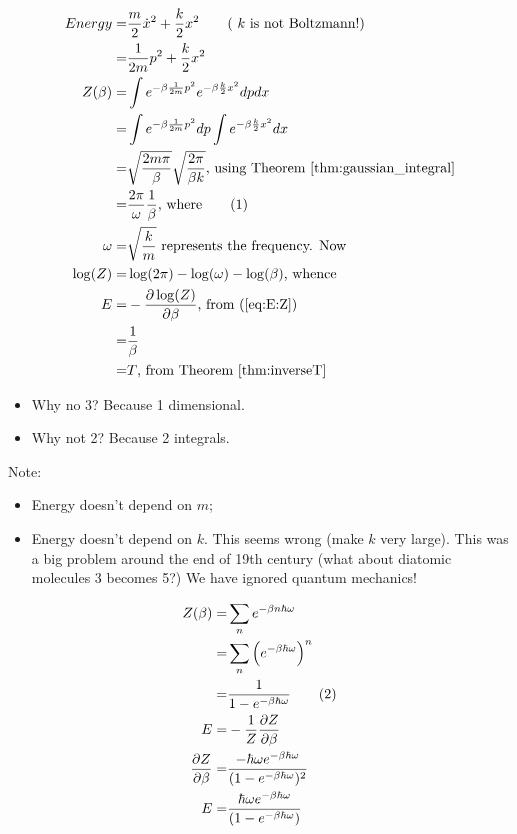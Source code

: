 \documentclass[]{article}
\newcommand\numberthis{\addtocounter{equation}{1}\tag{\theequation}}
\begin{document}
\begin{align*}
Energy =& \frac{m}{2} \dot{x}^ 2 + \frac{k}{2} x^2\tag{ $k$ is not Boltzmann!}\\
=& \frac{1}{2m} p^ 2 + \frac{k}{2} x^2\\
Z(\beta) =& \int e^{-\beta \frac{1}{2m} p^ 2 } e^{-\beta \frac{k}{2} x^2} dp dx\\
=& \int e^{-\beta \frac{1}{2m} p^ 2 } dp \int e^{-\beta \frac{k}{2} x^2} dx\\
=& \sqrt{\frac{2m\pi}{\beta}}\sqrt{\frac{2 \pi}{\beta k}} \text{, using Theorem \ref{thm:gaussian_integral}}\\
=& \frac{2 \pi}{\omega}\frac{1}{\beta}\text{, where} \numberthis\label{eq:Z:classical:q}\\
\omega =& \sqrt{\frac{k}{m}} \text{ represents the frequency. Now}\\
\log(Z) =& \log(2\pi) -\log(\omega) - \log(\beta)\text{, whence }\\
E =& - \frac{\partial \log(Z)}{\partial \beta}\text{, from (\ref{eq:E:Z})}\\
=& \frac{1}{\beta}\\
=& T \text{, from Theorem \ref{thm:inverseT}}
\end{align*}

\begin{itemize}
	\item Why no 3? Because 1 dimensional.
	\item Why not 2? Because 2 integrals.
\end{itemize}

Note:
\begin{itemize}
	\item Energy doesn't depend on $m$;
	\item Energy doesn't depend on $k$. This seems wrong (make $k$ very large). This was a big problem around the end of 19th century (what about diatomic molecules 3 becomes 5?) We have ignored quantum mechanics!
\end{itemize}



\begin{align*}
	Z(\beta) =& \sum_{n} e^{- \beta n \hbar \omega}\\
	 =& \sum_{n} \Big(e^{- \beta\hbar \omega}\Big)^n\\
	 =& \frac{1}{1 - e^{- \beta\hbar \omega}}\numberthis\label{Z_quantum_shm}\\
	 E =& - \frac{1}{Z} \frac{\partial Z}{\partial \beta}\\
	 \frac{\partial Z}{\partial \beta}=& \frac{- \hbar \omega e^{- \beta\hbar \omega}}{(1 - e^{- \beta\hbar \omega})^2}\\
	 E =& \frac{ \hbar \omega e^{- \beta\hbar \omega}}{(1 - e^{- \beta\hbar \omega})}
\end{align*}
\end{document}
